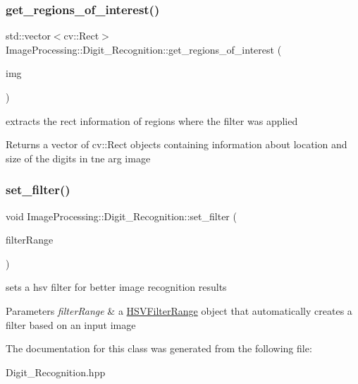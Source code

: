 \subsubsection{\texorpdfstring{get\+\_\+regions\+\_\+of\+\_\+interest()}{get\_regions\_of\_interest()}}
{\footnotesize\ttfamily std\+::vector$<$cv\+::\+Rect$>$ Image\+Processing\+::\+Digit\+\_\+\+Recognition\+::get\+\_\+regions\+\_\+of\+\_\+interest (\begin{DoxyParamCaption}\item[{cv\+::\+Mat \&}]{img }\end{DoxyParamCaption})}



extracts the rect information of regions where the filter was applied 

\begin{DoxyReturn}{Returns}
a vector of cv\+::\+Rect objects containing information about location and size of the digits in tne arg image 
\end{DoxyReturn}
\mbox{\label{class_image_processing_1_1_digit___recognition_adfae039ca51d000e71273256b3eb9279}} 
\subsubsection{\texorpdfstring{set\+\_\+filter()}{set\_filter()}}
{\footnotesize\ttfamily void Image\+Processing\+::\+Digit\+\_\+\+Recognition\+::set\+\_\+filter (\begin{DoxyParamCaption}\item[{\mbox{\hyperlink{struct_image_processing_1_1_h_s_v_filter_range}{H\+S\+V\+Filter\+Range}}}]{filter\+Range }\end{DoxyParamCaption})}



sets a hsv filter for better image recognition results 


\begin{DoxyParams}{Parameters}
{\em filter\+Range} & a \mbox{\hyperlink{struct_image_processing_1_1_h_s_v_filter_range}{H\+S\+V\+Filter\+Range}} object that automatically creates a filter based on an input image \\
\hline
\end{DoxyParams}


The documentation for this class was generated from the following file\+:\begin{DoxyCompactItemize}
\item 
Digit\+\_\+\+Recognition.\+hpp\end{DoxyCompactItemize}
